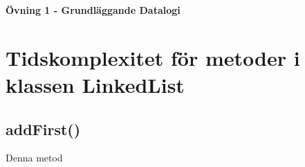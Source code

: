 \documentclass[12pt,letterpaper]{article}
\begin{document}
\textbf{\Large Övning 1 - Grundläggande Datalogi}

\section*{Tidskomplexitet för metoder i klassen LinkedList}
\subsection*{addFirst()}
Denna metod 
\end{document}
